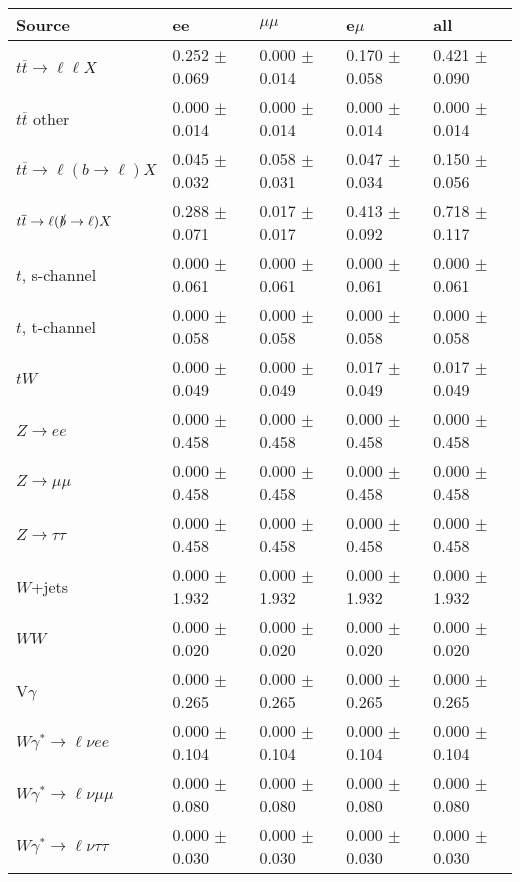 \begin{tabular}{l | l l l l}
\hline\hline
 Source  &  ee  &  $\mu\mu$  &  e$\mu$  &  all \\
\hline
$t\overline{t}\rightarrow \ell\ell X$ &  0.252 $\pm$  0.069 &  0.000 $\pm$  0.014 &  0.170 $\pm$  0.058 &  0.421 $\pm$  0.090\\
$t\overline{t}$ other &  0.000 $\pm$  0.014 &  0.000 $\pm$  0.014 &  0.000 $\pm$  0.014 &  0.000 $\pm$  0.014\\
$t\overline{t}\rightarrow \ell(b\rightarrow \ell)X$ &  0.045 $\pm$  0.032 &  0.058 $\pm$  0.031 &  0.047 $\pm$  0.034 &  0.150 $\pm$  0.056\\
$t\overline{t}\rightarrow \ell(\slashed{b}\rightarrow \ell)X$ &  0.288 $\pm$  0.071 &  0.017 $\pm$  0.017 &  0.413 $\pm$  0.092 &  0.718 $\pm$  0.117\\
\hline
$t$, s-channel &  0.000 $\pm$  0.061 &  0.000 $\pm$  0.061 &  0.000 $\pm$  0.061 &  0.000 $\pm$  0.061\\
$t$, t-channel &  0.000 $\pm$  0.058 &  0.000 $\pm$  0.058 &  0.000 $\pm$  0.058 &  0.000 $\pm$  0.058\\
$tW$ &  0.000 $\pm$  0.049 &  0.000 $\pm$  0.049 &  0.017 $\pm$  0.049 &  0.017 $\pm$  0.049\\
\hline
$Z\rightarrow ee$ &  0.000 $\pm$  0.458 &  0.000 $\pm$  0.458 &  0.000 $\pm$  0.458 &  0.000 $\pm$  0.458\\
$Z\rightarrow\mu\mu$ &  0.000 $\pm$  0.458 &  0.000 $\pm$  0.458 &  0.000 $\pm$  0.458 &  0.000 $\pm$  0.458\\
$Z\rightarrow\tau\tau$ &  0.000 $\pm$  0.458 &  0.000 $\pm$  0.458 &  0.000 $\pm$  0.458 &  0.000 $\pm$  0.458\\
$W$+jets &  0.000 $\pm$  1.932 &  0.000 $\pm$  1.932 &  0.000 $\pm$  1.932 &  0.000 $\pm$  1.932\\
$WW$ &  0.000 $\pm$  0.020 &  0.000 $\pm$  0.020 &  0.000 $\pm$  0.020 &  0.000 $\pm$  0.020\\
\hline
V$\gamma$ &  0.000 $\pm$  0.265 &  0.000 $\pm$  0.265 &  0.000 $\pm$  0.265 &  0.000 $\pm$  0.265\\
$W\gamma^{*}\rightarrow\ell\nu e e$ &  0.000 $\pm$  0.104 &  0.000 $\pm$  0.104 &  0.000 $\pm$  0.104 &  0.000 $\pm$  0.104\\
$W\gamma^{*}\rightarrow\ell\nu\mu\mu$ &  0.000 $\pm$  0.080 &  0.000 $\pm$  0.080 &  0.000 $\pm$  0.080 &  0.000 $\pm$  0.080\\
$W\gamma^{*}\rightarrow\ell\nu\tau\tau$ &  0.000 $\pm$  0.030 &  0.000 $\pm$  0.030 &  0.000 $\pm$  0.030 &  0.000 $\pm$  0.030\\

\end{tabular}
